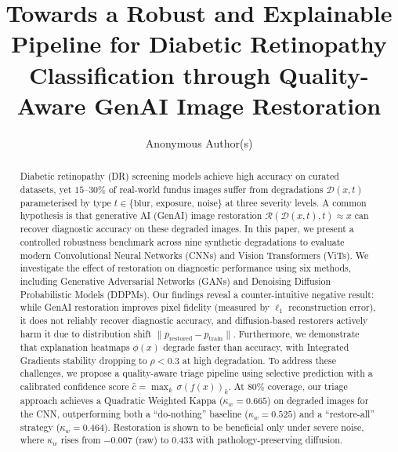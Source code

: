 \documentclass[runningheads]{llncs}
\begin{document}
    \title{Towards a Robust and Explainable Pipeline for Diabetic Retinopathy Classification through Quality-Aware GenAI Image Restoration}

\author{Anonymous Author(s)}

\maketitle

\begin{abstract}
Diabetic retinopathy (DR) screening models achieve high accuracy on curated datasets, yet $15$--$30\%$ of real-world fundus images suffer from degradations $\mathcal{D}(x, t)$ parameterised by type $t \in \{\text{blur},\, \text{exposure},\, \text{noise}\}$ at three severity levels. A common hypothesis is that generative AI (GenAI) image restoration $\mathcal{R}(\mathcal{D}(x,t),t) \approx x$ can recover diagnostic accuracy on these degraded images. In this paper, we present a controlled robustness benchmark across nine synthetic degradations to evaluate modern Convolutional Neural Networks (CNNs) and Vision Transformers (ViTs). We investigate the effect of restoration on diagnostic performance using six methods, including Generative Adversarial Networks (GANs) and Denoising Diffusion Probabilistic Models (DDPMs). Our findings reveal a counter-intuitive negative result: while GenAI restoration improves pixel fidelity (measured by $\ell_1$ reconstruction error), it does not reliably recover diagnostic accuracy, and diffusion-based restorers actively harm it due to distribution shift $\|p_{\text{restored}} - p_{\text{train}}\|$. Furthermore, we demonstrate that explanation heatmaps $\phi(x)$ degrade faster than accuracy, with Integrated Gradients stability dropping to $\rho < 0.3$ at high degradation. To address these challenges, we propose a quality-aware triage pipeline using selective prediction with a calibrated confidence score $\hat{c} = \max_k\, \sigma(f(x))_k$. At $80\%$ coverage, our triage approach achieves a Quadratic Weighted Kappa ($\kappa_w = 0.665$) on degraded images for the CNN, outperforming both a ``do-nothing'' baseline ($\kappa_w = 0.525$) and a ``restore-all'' strategy ($\kappa_w = 0.464$). Restoration is shown to be beneficial only under severe noise, where $\kappa_w$ rises from $-0.007$ (raw) to $0.433$ with pathology-preserving diffusion.
\end{abstract}
\end{document}
